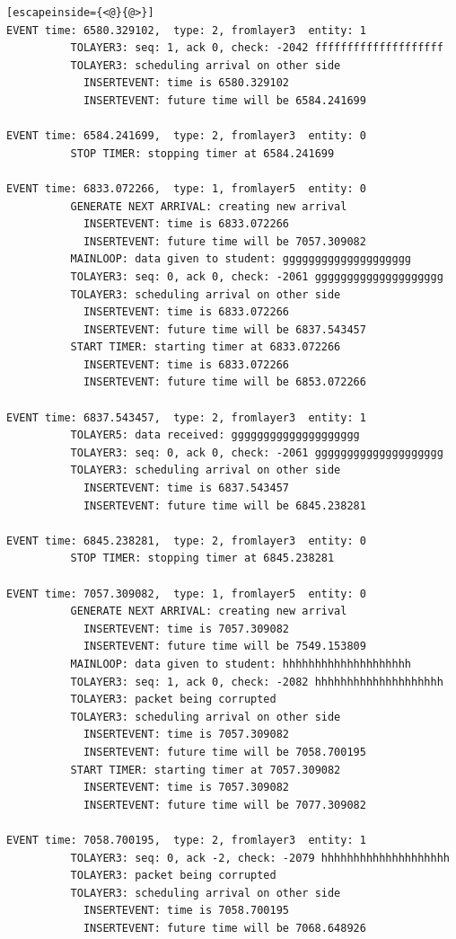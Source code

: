 \documentclass[paper=a4, fontsize=11pt]{scrartcl}
\numberwithin{equation}{section}		%
\numberwithin{figure}{section}			%
\numberwithin{table}{section}				%
\begin{document}
\begin{lstlisting}[escapeinside={<@}{@>}]
EVENT time: 6580.329102,  type: 2, fromlayer3  entity: 1
          TOLAYER3: seq: 1, ack 0, check: -2042 ffffffffffffffffffff
          TOLAYER3: scheduling arrival on other side
            INSERTEVENT: time is 6580.329102
            INSERTEVENT: future time will be 6584.241699

EVENT time: 6584.241699,  type: 2, fromlayer3  entity: 0
          STOP TIMER: stopping timer at 6584.241699

EVENT time: 6833.072266,  type: 1, fromlayer5  entity: 0
          GENERATE NEXT ARRIVAL: creating new arrival
            INSERTEVENT: time is 6833.072266
            INSERTEVENT: future time will be 7057.309082
          MAINLOOP: data given to student: gggggggggggggggggggg
          TOLAYER3: seq: 0, ack 0, check: -2061 gggggggggggggggggggg
          TOLAYER3: scheduling arrival on other side
            INSERTEVENT: time is 6833.072266
            INSERTEVENT: future time will be 6837.543457
          START TIMER: starting timer at 6833.072266
            INSERTEVENT: time is 6833.072266
            INSERTEVENT: future time will be 6853.072266

EVENT time: 6837.543457,  type: 2, fromlayer3  entity: 1
          TOLAYER5: data received: gggggggggggggggggggg
          TOLAYER3: seq: 0, ack 0, check: -2061 gggggggggggggggggggg
          TOLAYER3: scheduling arrival on other side
            INSERTEVENT: time is 6837.543457
            INSERTEVENT: future time will be 6845.238281

EVENT time: 6845.238281,  type: 2, fromlayer3  entity: 0
          STOP TIMER: stopping timer at 6845.238281

EVENT time: 7057.309082,  type: 1, fromlayer5  entity: 0
          GENERATE NEXT ARRIVAL: creating new arrival
            INSERTEVENT: time is 7057.309082
            INSERTEVENT: future time will be 7549.153809
          MAINLOOP: data given to student: hhhhhhhhhhhhhhhhhhhh
          TOLAYER3: seq: 1, ack 0, check: -2082 hhhhhhhhhhhhhhhhhhhh
          TOLAYER3: packet being corrupted
          TOLAYER3: scheduling arrival on other side
            INSERTEVENT: time is 7057.309082
            INSERTEVENT: future time will be 7058.700195
          START TIMER: starting timer at 7057.309082
            INSERTEVENT: time is 7057.309082
            INSERTEVENT: future time will be 7077.309082

EVENT time: 7058.700195,  type: 2, fromlayer3  entity: 1
          TOLAYER3: seq: 0, ack -2, check: -2079 hhhhhhhhhhhhhhhhhhhh
          TOLAYER3: packet being corrupted
          TOLAYER3: scheduling arrival on other side
            INSERTEVENT: time is 7058.700195
            INSERTEVENT: future time will be 7068.648926


\end{lstlisting}
\end{document}
